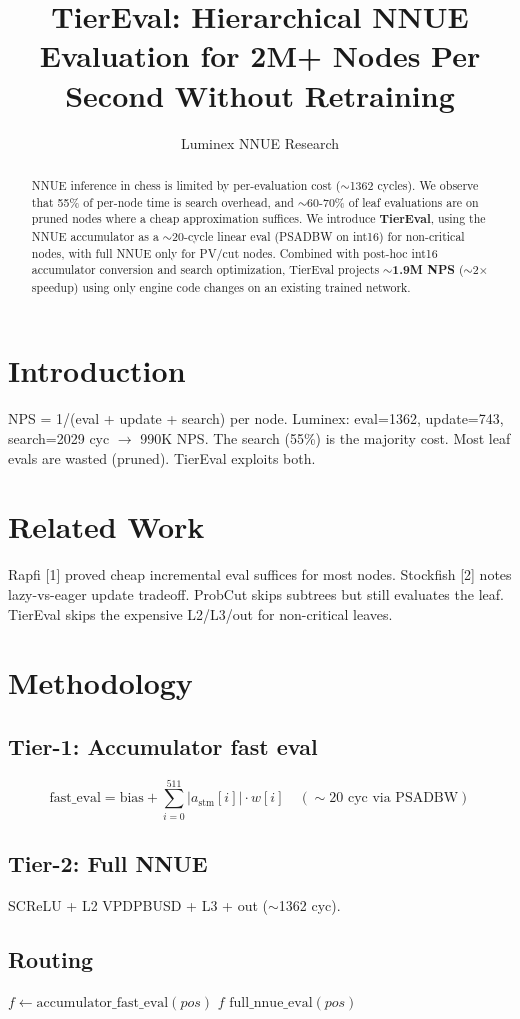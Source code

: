 \documentclass[conference]{IEEEtran}
\title{TierEval: Hierarchical NNUE Evaluation for 2M+ Nodes Per Second Without Retraining}
\author{Luminex NNUE Research}
\date{}
\begin{document}
\maketitle
\begin{abstract}
NNUE inference in chess is limited by per-evaluation cost ($\sim$1362 cycles). We observe that 55\% of per-node time is search overhead, and $\sim$60-70\% of leaf evaluations are on pruned nodes where a cheap approximation suffices. We introduce \textbf{TierEval}, using the NNUE accumulator as a $\sim$20-cycle linear eval (PSADBW on int16) for non-critical nodes, with full NNUE only for PV/cut nodes. Combined with post-hoc int16 accumulator conversion and search optimization, TierEval projects $\sim$\textbf{1.9M NPS} ($\sim$2$\times$ speedup) using only engine code changes on an existing trained network.
\end{abstract}
\section{Introduction}
NPS = 1/(eval + update + search) per node. Luminex: eval=1362, update=743, search=2029 cyc $\to$ 990K NPS. The search (55\%) is the majority cost. Most leaf evals are wasted (pruned). TierEval exploits both.
\section{Related Work}
Rapfi [1] proved cheap incremental eval suffices for most nodes. Stockfish [2] notes lazy-vs-eager update tradeoff. ProbCut skips subtrees but still evaluates the leaf. TierEval skips the expensive L2/L3/out for non-critical leaves.
\section{Methodology}
\subsection{Tier-1: Accumulator fast eval}
\begin{equation}
\text{fast\_eval} = \text{bias} + \sum_{i=0}^{511} |a_\text{stm}[i]| \cdot w[i] \quad (\sim 20\text{ cyc via PSADBW})
\end{equation}
\subsection{Tier-2: Full NNUE}
SCReLU + L2 VPDPBUSD + L3 + out ($\sim$1362 cyc).
\subsection{Routing}
\begin{algorithm}[H]
\caption{TierEval routing}\begin{algorithmic}[1]
\State $f \gets \text{accumulator\_fast\_eval}(pos)$ 
  \State \Return $f$ 
\EndIf
\State \Return $\text{full\_nnue\_eval}(pos)$ 
\end{algorithmic}\end{algorithm}
\end{document}
